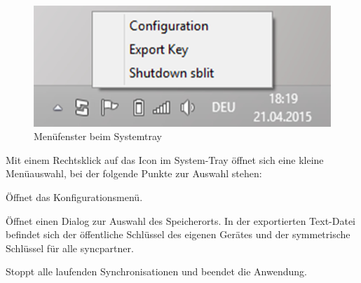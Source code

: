 \begin{figure}[H]
	\centering
	\includegraphics[]{images/systemtray.jpg}
  \caption{Menüfenster beim Systemtray}
\end{figure}

Mit einem Rechtsklick auf das Icon im System-Tray öffnet sich eine kleine Menüauswahl,
bei der folgende Punkte zur Auswahl stehen:

\begin{description}

		Öffnet das Konfigurationsmenü.

		Öffnet einen Dialog zur Auswahl des Speicherorts. In der exportierten Text-Datei befindet
		sich der öffentliche Schlüssel des eigenen Gerätes und der symmetrische Schlüssel für
		alle \gls{syncpartner}.

	  Stoppt alle laufenden Synchronisationen und beendet die Anwendung.
\end{description}
